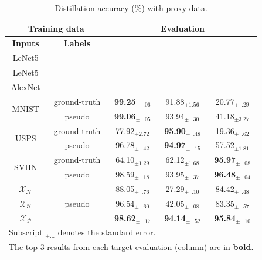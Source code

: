 \begin{table}[h] %
    \caption{Distillation accuracy (\%) with proxy data.}
    \centering
    \begin{tabular}{c|c|c|c|c}
        \hline \multicolumn{2}{c|}{\textbf{Training data}} & \multicolumn{3}{c}{\textbf{Evaluation}} \\
        \hline \textbf{Inputs} & \textbf{Labels}          & \makecell{\textbf{MNIST} \\ LeNet5} & \makecell{\textbf{USPS} \\ LeNet5} & \makecell{\textbf{SVHN} \\ AlexNet} \\
        \hline \multirow{2}{*}{MNIST}    & ground-truth & \textbf{99.25}$_{\pm  \phantom{0}.06}$ &          91.88$_{\pm           1.56}$ &          20.77$_{\pm \phantom{0}.29}$ \\
                                         & pseudo       & \textbf{99.06}$_{\pm  \phantom{0}.05}$ &          93.94$_{\pm \phantom{0}.30}$ &          41.18$_{\pm           3.27}$ \\
        \hline \multirow{2}{*}{USPS}     & ground-truth &          77.92$_{\pm            2.72}$ & \textbf{95.90}$_{\pm \phantom{0}.48}$ &          19.36$_{\pm \phantom{0}.62}$ \\
                                         & pseudo       &          96.78$_{\pm  \phantom{0}.42}$ & \textbf{94.97}$_{\pm \phantom{0}.15}$ &          57.52$_{\pm           1.81}$ \\
        \hline \multirow{2}{*}{SVHN}     & ground-truth &          64.10$_{\pm            1.29}$ &          62.12$_{\pm           1.68}$ & \textbf{95.97}$_{\pm \phantom{0}.08}$ \\
                                         & pseudo       &          98.59$_{\pm  \phantom{0}.18}$ &          93.95$_{\pm \phantom{0}.37}$ & \textbf{96.48}$_{\pm \phantom{0}.04}$ \\
        \hline $\mathcal{X}_\mathcal{N}$ &              &          88.05$_{\pm  \phantom{0}.76}$ &          27.29$_{\pm \phantom{0}.10}$ &          84.42$_{\pm \phantom{0}.48}$ \\
               $\mathcal{X}_\mathcal{U}$ & pseudo       &          96.54$_{\pm  \phantom{0}.60}$ &          42.05$_{\pm \phantom{0}.08}$ &          83.35$_{\pm \phantom{0}.57}$ \\
               $\mathcal{X}_\mathcal{P}$ &              & \textbf{98.62}$_{\pm  \phantom{0}.17}$ & \textbf{94.14}$_{\pm \phantom{0}.52}$ & \textbf{95.84}$_{\pm \phantom{0}.10}$ \\
        \hline
        \multicolumn{5}{l}{Subscript $_{\pm \ldots}$ denotes the standard error.} \\
        \multicolumn{5}{l}{The top-3 results from each target evaluation (column) are in \textbf{bold}.} \\
    \end{tabular}
    \label{tab:abla-naive-approaches}
\end{table}

